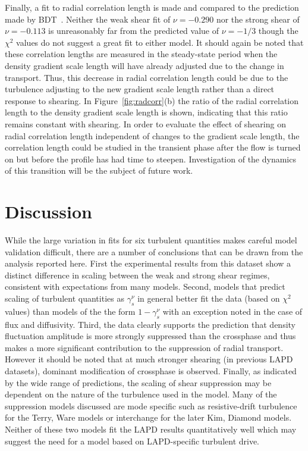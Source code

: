 \documentclass[aip,pop,amsmath,amssymb,preprint,superscriptaddress]{revtex4-1} %
\begin{document}
Finally, a fit to radial correlation length is made and compared to the prediction made by BDT~\cite{biglari90}. Neither the weak shear fit of $\nu = -0.290$ nor the strong shear of $\nu = -0.113$ is unreasonably far from the predicted value of $\nu = -1/3$ though the $\chi^{2}$ values do not suggest a great fit to either model.  It should again be noted that these correlation lengths are measured in the steady-state period when the density gradient scale length will have already adjusted due to the change in transport. Thus, this decrease in radial correlation length could be due to the turbulence adjusting to the new gradient scale length rather than a direct response to shearing.  In Figure~\ref{fig:radcorr}(b) the ratio of the radial correlation length to the density gradient scale length is shown, indicating that this ratio remains constant with shearing. In order to evaluate the effect of shearing on radial correlation length independent of changes to the gradient scale length, the correlation length could be studied in the transient phase after the flow is turned on but before the profile has had time to steepen.   Investigation of the dynamics of this transition will be the subject of future work. 

\section{Discussion}

While the large variation in fits for six turbulent quantities makes careful model validation difficult, there are a number of conclusions that can be drawn from the analysis reported here. First the experimental results from this dataset show a distinct difference in scaling between the weak and strong shear regimes, consistent with expectations from many models. Second, models that predict scaling of turbulent quantities as $\gamma_{s}^{\nu}$ in general better fit the data (based on $\chi^{2}$ values) than models of the the form $1-\gamma_{s}^{\nu}$ with an exception noted in the case of flux and diffusivity. Third, the data clearly supports the prediction that density fluctuation amplitude is more strongly suppressed than the crossphase and thus makes a more significant contribution to the suppression of radial transport.  However it should be noted that at much stronger shearing (in previous LAPD datasets), dominant modification of crossphase is observed.  Finally, as indicated by the wide range of predictions, the scaling of shear suppression may be dependent on the nature of the turbulence used in the model. Many of the suppression models discussed are mode specific such as resistive-drift turbulence for the Terry, Ware models or interchange for the later Kim, Diamond models. Neither of these two models fit the LAPD results quantitatively well which  may suggest the need for a model based on LAPD-specific turbulent drive.
\end{document}
